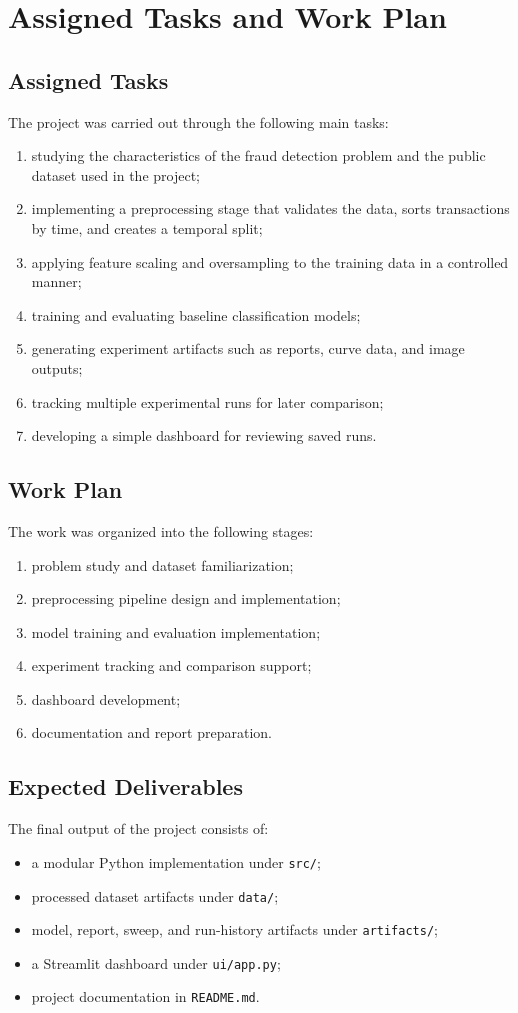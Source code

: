 \documentclass[12pt,a4paper]{report}
\begin{document}
\chapter{Assigned Tasks and Work Plan}
\section{Assigned Tasks}
The project was carried out through the following main tasks:
\begin{enumerate}
    \item studying the characteristics of the fraud detection problem and the public dataset used in the project;
    \item implementing a preprocessing stage that validates the data, sorts transactions by time, and creates a temporal split;
    \item applying feature scaling and oversampling to the training data in a controlled manner;
    \item training and evaluating baseline classification models;
    \item generating experiment artifacts such as reports, curve data, and image outputs;
    \item tracking multiple experimental runs for later comparison;
    \item developing a simple dashboard for reviewing saved runs.
\end{enumerate}

\section{Work Plan}
The work was organized into the following stages:
\begin{enumerate}
    \item problem study and dataset familiarization;
    \item preprocessing pipeline design and implementation;
    \item model training and evaluation implementation;
    \item experiment tracking and comparison support;
    \item dashboard development;
    \item documentation and report preparation.
\end{enumerate}

\section{Expected Deliverables}
The final output of the project consists of:
\begin{itemize}
    \item a modular Python implementation under \texttt{src/};
    \item processed dataset artifacts under \texttt{data/};
    \item model, report, sweep, and run-history artifacts under \texttt{artifacts/};
    \item a Streamlit dashboard under \texttt{ui/app.py};
    \item project documentation in \texttt{README.md}.
\end{itemize}
\end{document}
